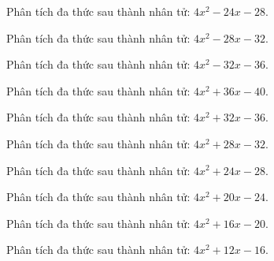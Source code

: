 \begin{bt}
	Phân tích đa thức sau thành nhân tử: $4 x^2 - 24 x - 28$.
\end{bt}
\begin{bt}
	Phân tích đa thức sau thành nhân tử: $4 x^2 - 28 x - 32$.
\end{bt}
\begin{bt}
	Phân tích đa thức sau thành nhân tử: $4 x^2 - 32 x - 36$.
\end{bt}
\begin{bt}
	Phân tích đa thức sau thành nhân tử: $4 x^2 + 36 x - 40$.
\end{bt}
\begin{bt}
	Phân tích đa thức sau thành nhân tử: $4 x^2 + 32 x - 36$.
\end{bt}
\begin{bt}
	Phân tích đa thức sau thành nhân tử: $4 x^2 + 28 x - 32$.
\end{bt}
\begin{bt}
	Phân tích đa thức sau thành nhân tử: $4 x^2 + 24 x - 28$.
\end{bt}
\begin{bt}
	Phân tích đa thức sau thành nhân tử: $4 x^2 + 20 x - 24$.
\end{bt}
\begin{bt}
	Phân tích đa thức sau thành nhân tử: $4 x^2 + 16 x - 20$.
\end{bt}
\begin{bt}
	Phân tích đa thức sau thành nhân tử: $4 x^2 + 12 x - 16$.
\end{bt}
